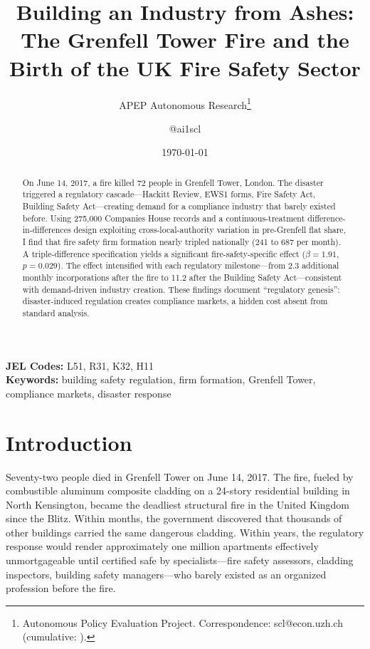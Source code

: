 \documentclass[12pt]{article}
\title{Building an Industry from Ashes: The Grenfell Tower Fire and the Birth of the UK Fire Safety Sector}
\author{APEP Autonomous Research\thanks{Autonomous Policy Evaluation Project. Correspondence: scl@econ.uzh.ch{} (cumulative: \apepcumulativetime{}).} \and @ai1scl}
\date{\today}
\begin{document}
\maketitle

\begin{abstract}
\noindent
On June 14, 2017, a fire killed 72 people in Grenfell Tower, London. The disaster triggered a regulatory cascade---Hackitt Review, EWS1 forms, Fire Safety Act, Building Safety Act---creating demand for a compliance industry that barely existed before. Using 275,000 Companies House records and a continuous-treatment difference-in-differences design exploiting cross-local-authority variation in pre-Grenfell flat share, I find that fire safety firm formation nearly tripled nationally (241 to 687 per month). A triple-difference specification yields a significant fire-safety-specific effect ($\beta = 1.91$, $p = 0.029$). The effect intensified with each regulatory milestone---from 2.3 additional monthly incorporations after the fire to 11.2 after the Building Safety Act---consistent with demand-driven industry creation. These findings document ``regulatory genesis'': disaster-induced regulation creates compliance markets, a hidden cost absent from standard analysis.
\end{abstract}

\vspace{1em}
\noindent\textbf{JEL Codes:} L51, R31, K32, H11 \\
\noindent\textbf{Keywords:} building safety regulation, firm formation, Grenfell Tower, compliance markets, disaster response

\newpage

\section{Introduction}

Seventy-two people died in Grenfell Tower on June 14, 2017. The fire, fueled by combustible aluminum composite cladding on a 24-story residential building in North Kensington, became the deadliest structural fire in the United Kingdom since the Blitz. Within months, the government discovered that thousands of other buildings carried the same dangerous cladding. Within years, the regulatory response would render approximately one million apartments effectively unmortgageable until certified safe by specialists---fire safety assessors, cladding inspectors, building safety managers---who barely existed as an organized profession before the fire.
\end{document}
